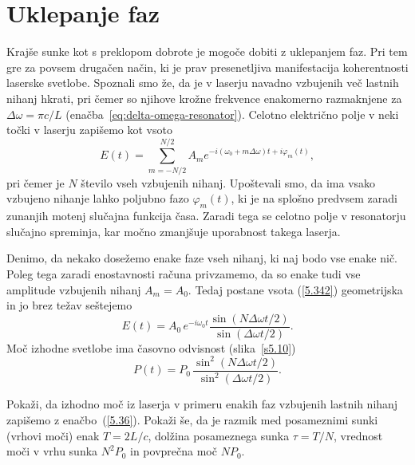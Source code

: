 \section{Uklepanje faz}
\label{chap:Uklepanje}
Krajše sunke kot s preklopom dobrote je mogoče dobiti z uklepanjem faz.
Pri tem gre za povsem drugačen način, ki je prav presenetljiva manifestacija 
koherentnosti laserske svetlobe. Spoznali smo že, da je v laserju navadno 
vzbujenih več lastnih nihanj hkrati, pri čemer so njihove krožne frekvence 
enakomerno razmaknjene za $\Delta \omega =\pi c/L$ 
(enačba~\ref{eq:delta-omega-resonator}). Celotno električno
polje v neki točki v laserju zapišemo kot vsoto 
\begin{equation}
E(t)=\sum_{m=-N/2}^{N/2}A_{m}e^{-i(\omega _{0}+m\Delta \omega )t+i\varphi
_{m}(t)},
\label{5.342}
\end{equation}
pri čemer je $N$ število vseh vzbujenih nihanj. Upoštevali smo, da ima vsako
vzbujeno nihanje lahko poljubno fazo $\varphi _{m}(t)$, ki je na splošno predvsem
zaradi zunanjih motenj slučajna funkcija časa. Zaradi tega se
celotno polje v resonatorju slučajno spreminja, kar močno zmanjšuje uporabnost
takega laserja.

Denimo, da nekako dosežemo enake faze vseh nihanj, ki naj bodo vse enake nič. 
Poleg tega zaradi enostavnosti
računa privzamemo, da so enake tudi vse amplitude vzbujenih nihanj $A_{m}= A_0$. Tedaj
postane vsota (\ref{5.342}) geometrijska in jo brez težav seštejemo 
\begin{equation}
E(t)=A_{0}\,e^{-i\omega _{0}t}\frac{\sin (N\Delta \omega t/2)}{\sin(\Delta
\omega t/2)}.
\label{5.352}
\end{equation}
Moč izhodne svetlobe ima časovno odvisnost (slika~\ref{s5.10})
\begin{equation}
P(t)=P_{0}\,\frac{\sin ^{2}(N\Delta \omega t/2)}{\sin ^{2}(\Delta \omega t/2)}.
\label{5.36}
\end{equation}

\begin{definition}
\label{naloga:mlock}
Pokaži, da izhodno moč iz laserja v primeru enakih faz vzbujenih lastnih nihanj
zapišemo z enačbo~(\ref{5.36}). Pokaži še, da je razmik med posameznimi sunki (vrhovi
moči) enak $T=2L/c$, dolžina posameznega sunka $\tau = T/N$, vrednost moči v vrhu 
sunka $N^{2}P_{0}$ in povprečna moč $NP_{0}$.
\end{definition}

